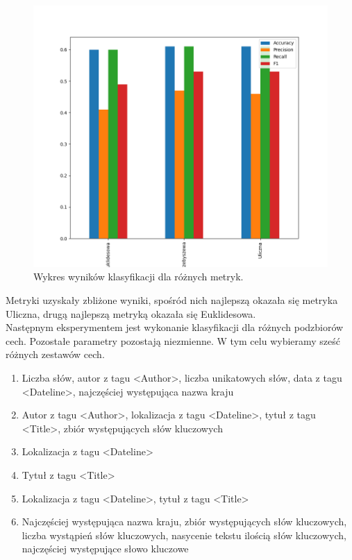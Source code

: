 \documentclass{classrep}
\begin{document}
\newpage

\begin{figure}[h!]
 \centering
 \includegraphics[width=15cm]{wykres_metryka.png}
 \vspace{-0.3cm}
 \caption{Wykres wyników klasyfikacji dla różnych metryk.}
 \label{wykres2}
\end{figure}

Metryki uzyskały zbliżone wyniki, spośród nich najlepszą okazała się metryka Uliczna, drugą najlepszą metryką okazała się Euklidesowa. \\



Następnym eksperymentem jest wykonanie klasyfikacji dla różnych podzbiorów cech. Pozostałe parametry pozostają niezmienne. W tym celu wybieramy sześć różnych zestawów cech. 

\begin{enumerate}
\item Liczba słów, autor z tagu \textless Author\textgreater, liczba unikatowych słów, data z tagu \textless Dateline\textgreater, najczęściej występująca nazwa kraju
\item Autor z tagu \textless Author\textgreater, lokalizacja z tagu \textless Dateline\textgreater, tytuł z tagu \textless Title\textgreater, zbiór występujących słów kluczowych
\item Lokalizacja z tagu \textless Dateline\textgreater
\item Tytuł z tagu \textless Title\textgreater
\item Lokalizacja z tagu \textless Dateline\textgreater, tytuł z tagu \textless Title\textgreater
\item Najczęściej występująca nazwa kraju, zbiór występujących słów kluczowych, liczba wystąpień słów kluczowych, nasycenie tekstu ilością słów kluczowych, najczęściej występujące słowo kluczowe 
\end{enumerate}
\end{document}
